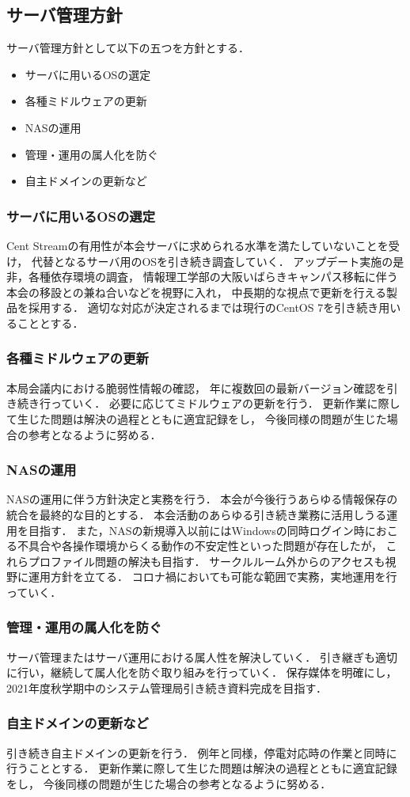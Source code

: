 \subsection*{サーバ管理方針}


サーバ管理方針として以下の五つを方針とする．
\begin{itemize}
    \item サーバに用いるOSの選定
    \item 各種ミドルウェアの更新
    \item NASの運用
    \item 管理・運用の属人化を防ぐ
    \item 自主ドメインの更新など
\end{itemize}

\subsubsection*{サーバに用いるOSの選定}
Cent Streamの有用性が本会サーバに求められる水準を満たしていないことを受け，
代替となるサーバ用のOSを引き続き調査していく．
アップデート実施の是非，各種依存環境の調査，
情報理工学部の大阪いばらきキャンパス移転に伴う本会の移設との兼ね合いなどを視野に入れ，
中長期的な視点で更新を行える製品を採用する．
適切な対応が決定されるまでは現行のCentOS 7を引き続き用いることとする．

\subsubsection*{各種ミドルウェアの更新}
本局会議内における脆弱性情報の確認，
年に複数回の最新バージョン確認を引き続き行っていく．
必要に応じてミドルウェアの更新を行う．
更新作業に際して生じた問題は解決の過程とともに適宜記録をし，
今後同様の問題が生じた場合の参考となるように努める．

\subsubsection*{NASの運用}
NASの運用に伴う方針決定と実務を行う．
本会が今後行うあらゆる情報保存の統合を最終的な目的とする．
本会活動のあらゆる引き続き業務に活用しうる運用を目指す．
また，NASの新規導入以前にはWindowsの同時ログイン時におこる不具合や各操作環境からくる動作の不安定性といった問題が存在したが，
これらプロファイル問題の解決も目指す．
サークルルーム外からのアクセスも視野に運用方針を立てる．
コロナ禍においても可能な範囲で実務，実地運用を行っていく．

\subsubsection*{管理・運用の属人化を防ぐ}
サーバ管理またはサーバ運用における属人性を解決していく．
引き継ぎも適切に行い，継続して属人化を防ぐ取り組みを行っていく．
保存媒体を明確にし，2021年度秋学期中のシステム管理局引き続き資料完成を目指す．

\subsubsection*{自主ドメインの更新など}
引き続き自主ドメインの更新を行う．
例年と同様，停電対応時の作業と同時に行うこととする．
更新作業に際して生じた問題は解決の過程とともに適宜記録をし，
今後同様の問題が生じた場合の参考となるように努める．
